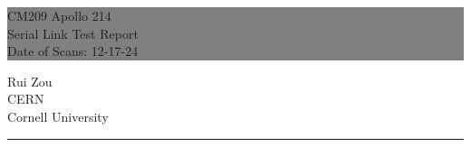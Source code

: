 \documentclass{report}
\newcommand\dateofscans{12-17-24} %
\begin{document}

\begin{titlepage} %
  
  
  \colorbox{grey}{
    \parbox[t]{0.93\textwidth}{ %
      \parbox[t]{0.91\textwidth}{ %
        \raggedleft %
        \fontsize{80pt}{40pt}\selectfont %
        \vspace{0.7cm} %

        CM209 Apollo 214\\
        Serial Link Test Report\\
        Date of Scans: \dateofscans\\
        
        \vspace{0.7cm} %
        }
      }
    }
  
  \vfill %
  
  
  \parbox[t]{0.93\textwidth}{ %
    \raggedleft %
    \large %
    {\Large Rui Zou}\\[4pt] %
    CERN\\
    Cornell University\\[4pt] %
    
    \hfill\rule{0.2\linewidth}{1pt}%
    }
  
\end{titlepage}

\hypertarget{MyToc}{}  %
\tableofcontents
\newpage
\end{document}
